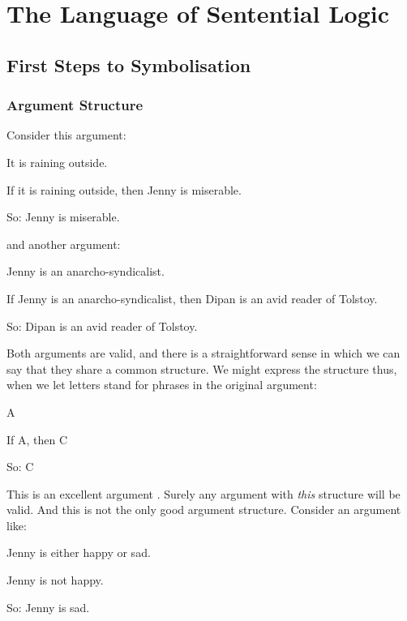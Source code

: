 \part{The Language of Sentential Logic}
\label{ch.TFL}

\chapter{First Steps to Symbolisation}\label{s:firststeps}

\section{Argument Structure}\label{s:ValidityInVirtueOfForm}
Consider this argument:
	\begin{earg}
		\item[] It is raining outside.
		\item[] \textsf{If} it is raining outside, \textsf{then} Jenny is miserable.
		\item[So:] Jenny is miserable.
	\end{earg}
and another argument:
	\begin{earg}
		\item[] Jenny is an anarcho-syndicalist.
		\item[] \textsf{If} Jenny is an anarcho-syndicalist, \textsf{then} Dipan is an avid reader of Tolstoy.
		\item[So:] Dipan is an avid reader of Tolstoy.
	\end{earg}
Both arguments are valid, and there is a straightforward sense in which we can say that they share a common structure. We might express the structure thus, when we let letters stand for phrases in the original argument:
	\begin{earg}
		\item[] A
		\item[] \textsf{If} A, \textsf{then} C
		\item[So:] C
	\end{earg}
This is an excellent argument . Surely any argument with \emph{this} structure will be valid. And this is not the only good argument structure. Consider an argument like:
	\begin{earg}
		\item[] Jenny is \textsf{either} happy \textsf{or} sad.
		\item[] Jenny is \textsf{not} happy.
		\item[So:] Jenny is sad.
	\end{earg}
